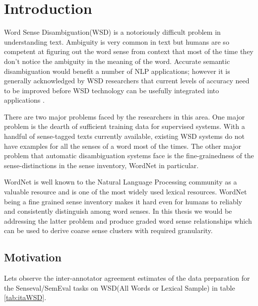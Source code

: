 \chapter{Introduction}

Word Sense Disambiguation(WSD) is a notoriously difficult problem in understanding text. Ambiguity is very common in text but humans are so competent at figuring out the word sense from context that most of the time they don't notice the ambiguity in the meaning of the word. Accurate semantic disambiguation would benefit a number of NLP applications; however it is generally acknowledged by WSD researchers that current levels of accuracy need to be improved before WSD technology can be usefully integrated into applications \citep{ide2006making}.

There are two major problems faced by the researchers in this area. One major problem is the dearth of sufficient training data for supervised systems. With a handful of sense-tagged texts currently available, existing WSD systems do not have examples for all the senses of a word most of the times. The other major problem that automatic disambiguation systems face is the fine-grainedness of the sense-distinctions in the sense inventory, WordNet in particular. 

WordNet \citep{miller1995wordnet} \citep{fellbaum1998wordnet} is well known to the Natural Language Processing community as a valuable resource and is one of the most widely used lexical resources. WordNet being a fine grained sense inventory makes it hard even for humans to reliably and consistently distinguish among word senses. In this thesis we would be addressing the latter problem and produce graded word sense relationships which can be used to derive coarse sense clusters with required granularity.

\section{Motivation}

Lets observe the inter-annotator agreement estimates of the data preparation for the Senseval/SemEval tasks on WSD(All Words or Lexical Sample) in table \ref{tab:itaWSD}.


